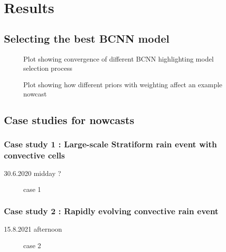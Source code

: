 \chapter{Results}
\label{chapter:results}

\section{Selecting the best BCNN model}

\begin{figure}[h]
	\label{fig:convergence-bcnn}
	\centering
	\caption{Plot showing convergence of different BCNN highlighting model selection process}
\end{figure}

\begin{figure}[ht]
	\label{fig:bcnn-candidates}
	\centering
	\caption{Plot showing how different priors with weighting affect an example nowcast}
\end{figure}

\section{Case studies for nowcasts}
\subsection{Case study 1 : Large-scale Stratiform rain event with convective cells}

30.6.2020 midday ? 

\begin{figure}
	\label{fig:case1}
	\centering
	\caption{case 1}
\end{figure}

\subsection{Case study 2 : Rapidly evolving convective rain event}

15.8.2021 afternoon

\begin{figure}
	\label{fig:case2}
	\centering
	\caption{case 2}
\end{figure}

